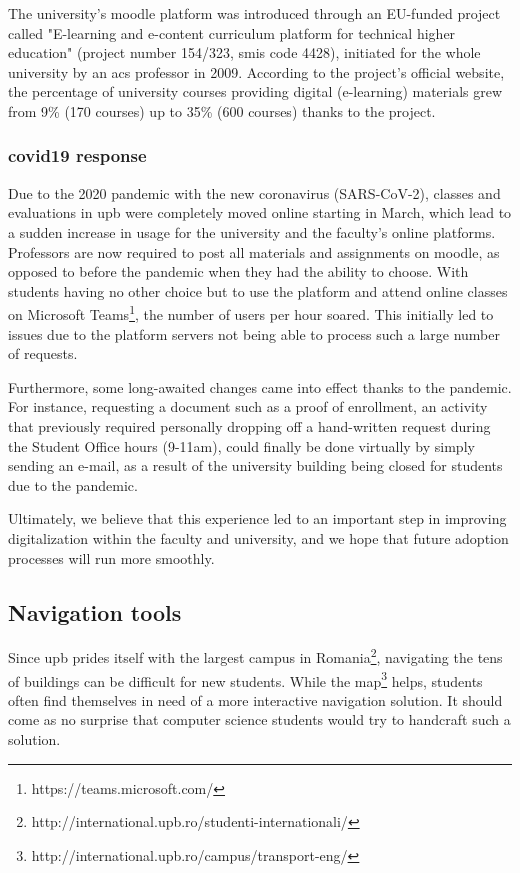     The university's \gls{moodle} platform was introduced through an EU-funded project called "E-learning and e-content curriculum platform for technical higher education" (project number 154/323, \gls{smis} code 4428), initiated for the whole university by an \acrshort{acs} professor in 2009. According to the project's official website\cite{upb2009elearning}, the percentage of university courses providing digital (e-learning) materials grew from 9\% (170 courses) up to 35\% (600 courses) thanks to the project.
    
    \subsubsection{\gls{covid19} response} \label{2:existing_apps_history_covid}
    Due to the 2020 pandemic with the new coronavirus (SARS-CoV-2), classes and evaluations in \acrshort{upb} were completely moved online starting in March, which lead to a sudden increase in usage for the university and the faculty's online platforms. Professors are now required to post all materials and assignments on \gls{moodle}, as opposed to before the pandemic when they had the ability to choose. With students having no other choice but to use the platform and attend online classes on Microsoft Teams\footnote{https://teams.microsoft.com/}, the number of users per hour soared. This initially led to issues due to the platform servers not being able to process such a large number of requests.
    
    Furthermore, some long-awaited changes came into effect thanks to the pandemic. For instance, requesting a document such as a proof of enrollment, an activity that previously required personally dropping off a hand-written request during the Student Office hours (9-11am), could finally be done virtually by simply sending an e-mail, as a result of the university building being closed for students due to the pandemic.
    
    Ultimately, we believe that this experience led to an important step in improving digitalization within the faculty and university, and we hope that future adoption processes will run more smoothly.
    
    \subsection{Navigation tools} \label{2:existing_apps_navigation}
    Since \acrshort{upb} prides itself with the largest campus in Romania\footnote{http://international.upb.ro/studenti-internationali/}, navigating the tens of buildings can be difficult for new students. While the map\footnote{http://international.upb.ro/campus/transport-eng/} helps, students often find themselves in need of a more interactive navigation solution. It should come as no surprise that computer science students would try to handcraft such a solution.
    
